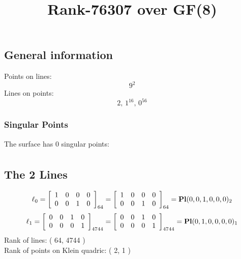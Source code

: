 \documentclass{article}
\newcommand\setTBstruts{\def\T{\rule{0pt}{2.6ex}}%
\def\B{\rule[-1.2ex]{0pt}{0pt}}}
\begin{document}
 
\setTBstruts



{\allowdisplaybreaks%






\title{Rank-76307 over GF(8)}
\author{}%
\maketitle%
%
{}



\subsection*{General information}
Points on lines:
$$
9^2$$
Lines on points:
$$
2,\,1^{16},\,0^{56}$$
\subsubsection*{Singular Points}
The surface has 0 singular points:\\
\begin{align*}
\end{align*}
\subsection*{The 2 Lines}
$$
\ell_{0} = 
\left[
\begin{array}{*{4}{r}}
1 & 0 & 0 & 0\\
0 & 0 & 1 & 0\\
\end{array}
\right]
_{64}
=
\left[
\begin{array}{*{4}c}
1  & 0  & 0  & 0\\
0  & 0  & 1  & 0\\
\end{array}
\right]_{64}
={\rm\bf Pl}(0,0,1,0,0,0 )_{2}$$
$$
\ell_{1} = 
\left[
\begin{array}{*{4}{r}}
0 & 0 & 1 & 0\\
0 & 0 & 0 & 1\\
\end{array}
\right]
_{4744}
=
\left[
\begin{array}{*{4}c}
0  & 0  & 1  & 0\\
0  & 0  & 0  & 1\\
\end{array}
\right]_{4744}
={\rm\bf Pl}(0,1,0,0,0,0 )_{1}$$
Rank of lines: ( 64, 4744 )\\
Rank of points on Klein quadric: ( 2, 1 )\\
}
\end{document}
